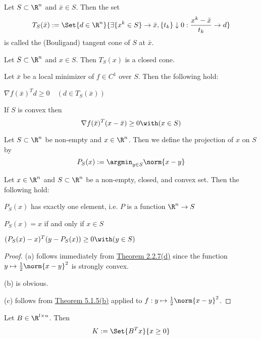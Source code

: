 \label{add7a4b}

Let $S\subset\R^n$ and $\bar x\in S$. Then the set
$$
	T_S(\bar x):=\Set{d\in\R^n}
	{\exists\{x^k\in S\}\to\bar x,\{t_k\}\downarrow0:\frac{x^k-\bar x}{t_k}\to d}
$$
is called the (Bouligand) tangent cone of $S$ at $\bar x$.

\label{fe814cc}

Let $S\subset\R^n$ and $x\in S$. Then $T_S(x)$ is a closed cone.

\label{c8e5836}

Let $\bar x$ be a local minimizer of $f\in C^1$ over $S$. Then the following hold:
\begin{enumerata}
	\item $\nabla f(\bar x)^Td\geq0\quad(d\in T_S(\bar x))$
	\item If $S$ is convex then
	$$
		\nabla f(\bar x)^T(x-\bar x)\geq 0\with(x\in S)
	$$
\end{enumerata}

\label{fb41457}

Let $S\subset\R^n$ be non-empty and $x\in\R^n$. Then we define the
projection of $x$ on $S$ by
$$
	P_S(x):=\argmin_{y\in S}\norm{x-y}
$$

\label{ce30ae7}

Let $x\in\R^n$ and $S\subset\R^n$ be a non-empty, closed, and convex
set. Then the following hold:
\begin{enumerata}
	\item $P_S(x)$ has exactly one element, i.e. $P$ is a function
	$\R^n\to S$
	\item $P_S(x)=x$ if and only if $x\in S$
	\item $(P_S(x)-x)^T(y-P_S(x))\geq0\with(y\in S)$
\end{enumerata}

\begin{proof}
	(a) follows immediately from \href{f546fc9}{Theorem 2.2.7(d)} since
	the function $y\mapsto\frac12\norm{x-y}^2$ is strongly convex.

	(b) is obvious.

	(c) follows from \href{c8e5836}{Theorem 5.1.5(b)} applied to
	$f:y\mapsto\frac12\norm{x-y}^2$.
\end{proof}

\label{d2dff14}

Let $B\in\R^{l\times n}$. Then
$$
	K:=\Set{B^Tx}{x\geq0}
$$

